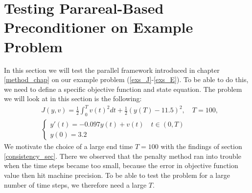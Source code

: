 \section{Testing Parareal-Based Preconditioner on Example Problem}
In this section we will test the parallel framework introduced in chapter \ref{method_chap} on our example problem (\ref{exs_J}-\ref{exs_E}). To be able to do this, we need to define a specific objective function and state equation. The problem we will look at in this section is the following:
\begin{align}
&J(y,v) = \frac{1}{2}\int_0^{T}v(t)^2dt + \frac{1}{2}(y(T)-11.5)^2,\quad T=100, \label{speed_j}\\
&\left\{
     \begin{array}{lr}
       	y'(t)=-0.097y(t) + v(t) \quad t\in(0,T)\\
       	y(0)=3.2
     \end{array}
   \right. \label{speed_e}
\end{align}
We motivate the choice of a large end time $T=100$ with the findings of section \ref{consistency_sec}. There we observed that the penalty method ran into trouble when the time steps became too small, because the error in objective function value then hit machine precision. To be able to test the problem for a large number of time steps, we therefore need a large $T$. 
